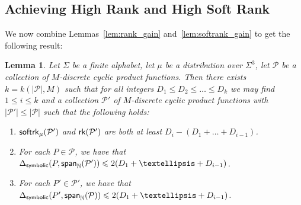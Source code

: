 \documentclass[10pt,a4paper]{amsart}
\newtheorem{lemma}[thm]{Lemma}
\newcommand\card[1]{\left| {#1} \right|}
\newcommand\spn{{\sf span}_{\mathbb{N}}}
\renewcommand\leq{\leqslant}
\begin{document}
    \subsection{Achieving High Rank and High Soft Rank}\label{sec:high_bothrank}
    We now combine Lemmas~\ref{lem:rank_gain} and~\ref{lem:softrank_gain} to get the following result:
    \begin{lemma}\label{lem:bothrank_gain}
        Let $\Sigma$ be a finite alphabet, let $\mu$ be a distribution over $\Sigma^3$, let $\mathcal{P}$ be a collection of $M$-discrete cyclic product functions. Then there exists $k = k(\card{\mathcal{P}},M)$
        such that for all integers $D_1\leq D_2\leq\ldots\leq D_k$ we may find $1\leq i\leq k$ and a collection $\mathcal{P}'$ of $M$-discrete cyclic product functions with $|\mathcal{P}'|\leq \card{\mathcal{P}}$ such that the following holds:
        \begin{enumerate}
            \item ${\sf softrk}_{\mu}(\mathcal{P}')$ and ${\sf rk}(\mathcal{P}')$ are both at least $D_i -
        (D_1+\ldots+D_{i-1})$.
            \item For each $P\in\mathcal{P}$, we have that 
            $\Delta_{{\sf symbolic}}(P,\spn(\mathcal{P}'))\leq 2(D_1+\ldots+D_{i-1})$.
            \item For each $P'\in\mathcal{P}'$, we have that 
            $\Delta_{{\sf symbolic}}(P',\spn(\mathcal{P}))\leq 2(D_1+\ldots+D_{i-1})$.
        \end{enumerate}
    \end{lemma}
\end{document}
